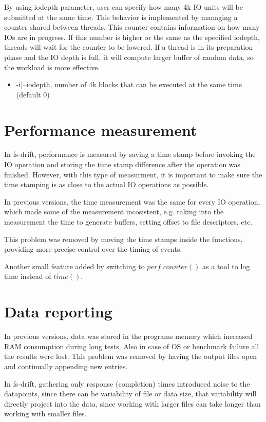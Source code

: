 \documentclass[
  color, %
  table, %
  lof,   %
  lot,   %
]{fithesis3}
\begin{document}
By using iodepth parameter, user can specify how many 4k IO units will be submitted at the same time. This behavior is implemented by managing a counter shared between threads. This counter contains information on how many IOs are in progress. If this number is higher or the same as the specified iodepth, threads will wait for the counter to be lowered. If a thread is in its preparation phase and the IO depth is full, it will compute larger buffer of random data, so the workload is more effective.


\begin{itemize}
    \item -i|--iodepth, number of 4k blocks that can be executed at the same time (default 0)
\end{itemize}



\section{Performance measurement}
In fs-drift, performance is measured by saving a time stamp before invoking the IO operation and storing the time stamp difference after the operation was finished. However, with this type of measurment, it is important to make sure the time stamping is as close to the actual IO operations as possible. 

In previous versions, the time measurement was the same for every IO operation, which made some of the measurement incosistent, e.g. taking into the measurement the time to generate buffers, setting offset to file descriptors. etc.

This problem was removed by moving the time stamps inside the functions, providing more precise control over the timing of events.

Another small feature added by switching to $perf\_counter()$ as a tool to log time instead of $time()$.


\section{Data reporting}
In previous versions, data was stored in the programs memory which increased RAM consumption during long tests. Also in case of OS or benchmark failure all the results were lost. This problem was removed by having the output files open and continually appending new entries.

In fs-drift, gathering only response (completion) times introduced noise to the datapoints, since there can be variability of file or data size, that variability will directly project into the data, since working with larger files can take longer than working with smaller files.
\end{document}
